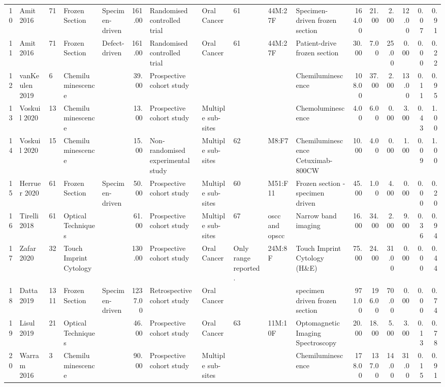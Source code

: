 \begin{table}[ht]
\begin{tabular}{rllllrlllllrrrrrr}
  10 & Amit 2016 & 71 & Frozen Section & Specimen-driven & 161.00 & Randomised controlled trial & Oral Cancer & 61 & 44M:27F & Specimen-driven frozen section & 164.00 & 21.00 & 2.00 & 12.00 & 0.07 & 0.91 \\ 
  11 & Amit 2016 & 71 & Frozen Section & Defect-driven & 161.00 & Randomised controlled trial & Oral Cancer & 61 & 44M:27F & Patient-drive frozen section & 30.00 & 7.00 & 25.00 & 0.00 & 0.00 & 0.22 \\ 
  12 & vanKeulen 2019 & 6 & Chemiluminescence &  & 39.00 & Prospective cohort study &  &  &  & Chemiluminescence & 108.00 & 37.00 & 2.00 & 13.00 & 0.11 & 0.95 \\ 
  13 & Voskuil 2020 & 13 & Chemiluminescence &  & 13.00 & Prospective cohort study & Multiple sub-sites &  &  & Chemoluminescence & 4.00 & 6.00 & 0.00 & 3.00 & 0.43 & 1.00 \\ 
  14 & Voskuil 2020 & 15 & Chemiluminescence &  & 15.00 & Non-randomised experimental study & Multiple sub-sites & 62 & M8:F7 & Chemiluminescence Cetuximab-800CW & 10.00 & 4.00 & 0.00 & 1.00 & 0.09 & 1.00 \\ 
  15 & Herruer 2020 & 61 & Frozen Section & Specimen-driven & 50.00 & Prospective cohort study & Multiple sub-sites & 60 & M51:F11 & Frozen section - specimen driven & 45.00 & 1.00 & 4.00 & 0.00 & 0.00 & 0.20 \\ 
  16 & Tirelli 2018 & 61 & Optical Techniques &  & 61.00 & Prospective cohort study & Multiple sub-sites & 67 & oscc and opscc & Narrow band imaging & 16.00 & 34.00 & 2.00 & 9.00 & 0.36 & 0.94 \\ 
  17 & Zafar 2020 & 32 & Touch Imprint Cytology &  & 130.00 & Prospective cohort study & Oral Cancer & Only range reported. & 24M:8F & Touch Imprint Cytology (H\&E) & 75.00 & 24.00 & 31.00 & 0.00 & 0.00 & 0.44 \\ 
  18 & Datta 2019 & 1311 & Frozen Section & Specimen-driven & 1237.00 & Retrospective cohort study & Oral Cancer &  &  & specimen driven frozen section & 971.00 & 196.00 & 70.00 & 0.00 & 0.00 & 0.74 \\ 
  19 & Lisul 2019 & 21 & Optical Techniques &  & 46.00 & Prospective cohort study & Oral Cancer & 63 & 11M:10F & Optomagnetic Imaging Spectroscopy & 20.00 & 18.00 & 5.00 & 3.00 & 0.13 & 0.78 \\ 
  20 & Warram 2016 & 3 & Chemiluminescence &  & 90.00 & Prospective cohort study & Multiple sub-sites &  &  & Chemiluminescence & 178.00 & 137.00 & 14.00 & 31.00 & 0.15 & 0.91 \\ 

\end{tabular}
\end{table}
